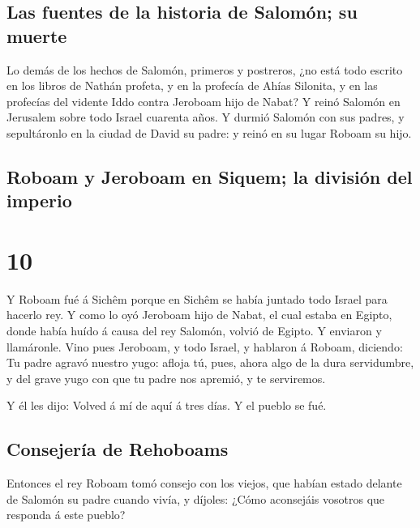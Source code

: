 \hypertarget{las-fuentes-de-la-historia-de-salomuxf3n-su-muerte}{%
\subsection{Las fuentes de la historia de Salomón; su
muerte}\label{las-fuentes-de-la-historia-de-salomuxf3n-su-muerte}}

 Lo demás de los hechos de Salomón, primeros y postreros,
¿no está todo escrito en los libros de Nathán profeta, y en la profecía
de Ahías Silonita, y en las profecías del vidente Iddo contra Jeroboam
hijo de Nabat?  Y reinó Salomón en Jerusalem sobre todo
Israel cuarenta años.  Y durmió Salomón con sus padres, y
sepultáronlo en la ciudad de David su padre: y reinó en su lugar Roboam
su hijo.

\hypertarget{roboam-y-jeroboam-en-siquem-la-divisiuxf3n-del-imperio}{%
\subsection{Roboam y Jeroboam en Siquem; la división del
imperio}\label{roboam-y-jeroboam-en-siquem-la-divisiuxf3n-del-imperio}}

\hypertarget{section-9}{%
\section{10}\label{section-9}}

 Y Roboam fué á Sichêm porque en Sichêm se había juntado
todo Israel para hacerlo rey.  Y como lo oyó Jeroboam hijo
de Nabat, el cual estaba en Egipto, donde había huído á causa del rey
Salomón, volvió de Egipto.  Y enviaron y llamáronle. Vino
pues Jeroboam, y todo Israel, y hablaron á Roboam, diciendo:
 Tu padre agravó nuestro yugo: afloja tú, pues, ahora algo
de la dura servidumbre, y del grave yugo con que tu padre nos apremió, y
te serviremos.

 Y él les dijo: Volved á mí de aquí á tres días. Y el
pueblo se fué.

\hypertarget{consejeruxeda-de-rehoboams}{%
\subsection{Consejería de Rehoboams}\label{consejeruxeda-de-rehoboams}}

 Entonces el rey Roboam tomó consejo con los viejos, que
habían estado delante de Salomón su padre cuando vivía, y díjoles: ¿Cómo
aconsejáis vosotros que responda á este pueblo?


